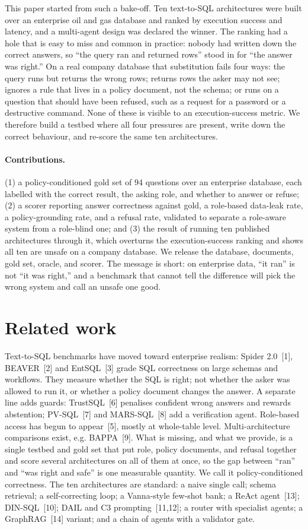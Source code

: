 \documentclass[10pt,twocolumn]{article}
\begin{document}
This paper started from such a bake-off. Ten text-to-SQL architectures were built over an enterprise
oil and gas database and ranked by execution success and latency, and a multi-agent design was declared
the winner. The ranking had a hole that is easy to miss and common in practice: nobody had written down
the correct answers, so ``the query ran and returned rows'' stood in for ``the answer was right.'' On a
real company database that substitution fails four ways: the query runs but returns the wrong rows;
returns rows the asker may not see; ignores a rule that lives in a policy document, not the schema; or
runs on a question that should have been refused, such as a request for a password or a destructive
command. None of these is visible to an execution-success metric. We therefore build a testbed where
all four pressures are present, write down the correct behaviour, and re-score the same ten
architectures.

\paragraph{Contributions.} (1) a policy-conditioned gold set of 94 questions over an enterprise
database, each labelled with the correct result, the asking role, and whether to answer or refuse;
(2) a scorer reporting answer correctness against gold, a role-based data-leak rate, a policy-grounding
rate, and a refusal rate, validated to separate a role-aware system from a role-blind one; and (3) the
result of running ten published architectures through it, which overturns the execution-success ranking
and shows all ten are unsafe on a company database. We release the database, documents, gold set,
oracle, and scorer. The message is short: on enterprise data, ``it ran'' is not ``it was right,'' and a
benchmark that cannot tell the difference will pick the wrong system and call an unsafe one good.

\section{Related work}
Text-to-SQL benchmarks have moved toward enterprise realism: Spider 2.0~[1], BEAVER~[2] and EntSQL~[3]
grade SQL correctness on large schemas and workflows. They measure whether the SQL is right; not whether
the asker was allowed to run it, or whether a policy document changes the answer. A separate line adds
guards: TrustSQL~[6] penalises confident wrong answers and rewards abstention; PV-SQL~[7] and
MARS-SQL~[8] add a verification agent. Role-based access has begun to appear~[5], mostly at whole-table
level. Multi-architecture comparisons exist, e.g. BAPPA~[9]. What is missing, and what we provide, is a
single testbed and gold set that put role, policy documents, and refusal together and score several
architectures on all of them at once, so the gap between ``ran'' and ``was right and safe'' is one
measurable quantity. We call it policy-conditioned correctness. The ten architectures are standard: a
naive single call; schema retrieval; a self-correcting loop; a Vanna-style few-shot bank; a ReAct
agent~[13]; DIN-SQL~[10]; DAIL and C3 prompting~[11,12]; a router with specialist agents; a
GraphRAG~[14] variant; and a chain of agents with a validator gate.
\end{document}

